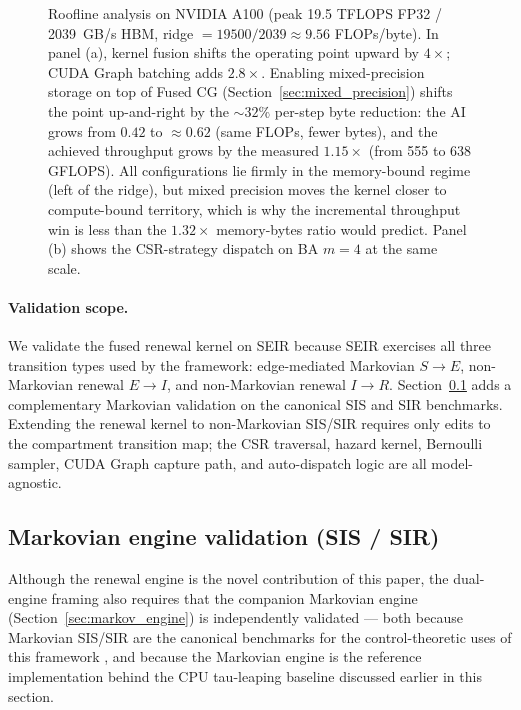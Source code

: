 \begin{figure}[H]
\centering

\caption{Roofline analysis on NVIDIA A100 (peak 19.5 TFLOPS FP32 / 2039~GB/s HBM, ridge $= 19500/2039 \approx 9.56$ FLOPs/byte). In panel (a), kernel fusion shifts the operating point upward by $4\times$; CUDA Graph batching adds $2.8\times$. Enabling mixed-precision storage on top of Fused CG (Section~\ref{sec:mixed_precision}) shifts the point up-and-right by the $\sim\!32\%$ per-step byte reduction: the AI grows from $0.42$ to $\approx 0.62$ (same FLOPs, fewer bytes), and the achieved throughput grows by the measured $1.15\times$ (from 555 to 638 GFLOPS). All configurations lie firmly in the memory-bound regime (left of the ridge), but mixed precision moves the kernel closer to compute-bound territory, which is why the incremental throughput win is less than the $1.32\times$ memory-bytes ratio would predict. Panel (b) shows the CSR-strategy dispatch on BA $m{=}4$ at the same scale.}
\label{fig:roofline}
\end{figure}

\paragraph{Validation scope.}
We validate the fused renewal kernel on SEIR because SEIR exercises all three transition types used by the framework: edge-mediated Markovian $S \to E$, non-Markovian renewal $E \to I$, and non-Markovian renewal $I \to R$. Section~\ref{sec:markov_validation} adds a complementary Markovian validation on the canonical SIS and SIR benchmarks. Extending the renewal kernel to non-Markovian SIS/SIR requires only edits to the compartment transition map; the CSR traversal, hazard kernel, Bernoulli sampler, CUDA Graph capture path, and auto-dispatch logic are all model-agnostic.

\subsection{Markovian engine validation (SIS / SIR)}
\label{sec:markov_validation}

Although the renewal engine is the novel contribution of this paper, the dual-engine framing also requires that the companion Markovian engine (Section~\ref{sec:markov_engine}) is independently validated --- both because Markovian SIS/SIR are the canonical benchmarks for the control-theoretic uses of this framework \citep{nowzari2016analysis, watkins2019robust, preciado2014optimal}, and because the Markovian engine is the reference implementation behind the CPU tau-leaping baseline discussed earlier in this section.

